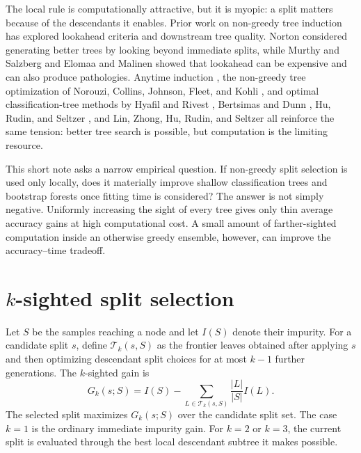 \documentclass[12pt]{article}
\begin{document}
The local rule is computationally attractive, but it is myopic: a split matters because of the descendants it enables. Prior work on non-greedy tree induction has explored lookahead criteria and downstream tree quality. Norton \citeyearpar{norton1989generating} considered generating better trees by looking beyond immediate splits, while Murthy and Salzberg \citeyearpar{murthy1995lookahead} and Elomaa and Malinen \citeyearpar{elomaa2005lookahead} showed that lookahead can be expensive and can also produce pathologies. Anytime induction \citep{esmeir2007anytime}, the non-greedy tree optimization of Norouzi, Collins, Johnson, Fleet, and Kohli \citeyearpar{norouzi2015efficient}, and optimal classification-tree methods by Hyafil and Rivest \citeyearpar{hyafil1976constructing}, Bertsimas and Dunn \citeyearpar{bertsimas2017optimal}, Hu, Rudin, and Seltzer \citeyearpar{hu2019optimal}, and Lin, Zhong, Hu, Rudin, and Seltzer \citeyearpar{lin2020generalized} all reinforce the same tension: better tree search is possible, but computation is the limiting resource.

This short note asks a narrow empirical question. If non-greedy split selection is used only locally, does it materially improve shallow classification trees and bootstrap forests once fitting time is considered? The answer is not simply negative. Uniformly increasing the sight of every tree gives only thin average accuracy gains at high computational cost. A small amount of farther-sighted computation inside an otherwise greedy ensemble, however, can improve the accuracy--time tradeoff.

\section{$k$-sighted split selection}

Let $S$ be the samples reaching a node and let $I(S)$ denote their impurity. For a candidate split $s$, define $\mathcal{T}_k(s,S)$ as the frontier leaves obtained after applying $s$ and then optimizing descendant split choices for at most $k-1$ further generations. The $k$-sighted gain is
\begin{equation}
G_k(s;S)
= I(S) -
\sum_{L \in \mathcal{T}_k(s,S)}
\frac{|L|}{|S|} I(L).
\label{eq:sighted}
\end{equation}
The selected split maximizes $G_k(s;S)$ over the candidate split set. The case $k=1$ is the ordinary immediate impurity gain. For $k=2$ or $k=3$, the current split is evaluated through the best local descendant subtree it makes possible.
\end{document}
